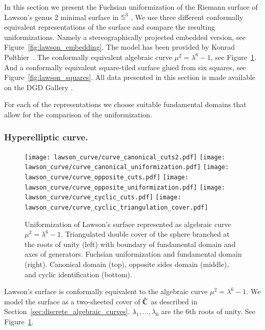 \documentclass[Thesis]{subfiles}
\begin{document}
In this section we present the Fuchsian uniformization of the Riemann surface of Lawson's genus 2 minimal surface in $\mathbb{S}^3$ \cite{Law1970}.
We use three different conformally equivalent representations of the surface and compare the resulting uniformizations.
Namely a stereographically projected embedded version, see Figure~\ref{fig:lawson_embedding}.
The model has been provided by Konrad Polthier~\cite{polthier97}.
The conformally equivalent algebraic curve $\mu^2=\lambda^6-1$, see Figure~\ref{fig:lawson_curve}.
And a conformally equivalent square-tiled surface glued from six squares, see Figure~\ref{fig:lawson_squares}.
All data presented in this section is made available on the {\sc DGD Gallery} \cite{gallery-lawson-webpage}.

For each of the representations we choose suitable fundamental domains that allow for the comparison of the uniformization.

\subsubsection{Hyperelliptic curve.}
\label{sec:lawson_curve}

\begin{figure}
	\centering
	\resizebox{!}{6cm} {
	\texttt{[image: lawson\_curve/curve\_canonical\_cuts2.pdf]}
	\texttt{[image: lawson\_curve/curve\_canonical\_uniformization.pdf]}
	}
	\resizebox{!}{6cm} {
	\texttt{[image: lawson\_curve/curve\_opposite\_cuts.pdf]}
	\texttt{[image: lawson\_curve/curve\_opposite\_uniformization.pdf]}
	}
	\resizebox{!}{6cm} {
	\texttt{[image: lawson\_curve/curve\_cyclic\_cuts.pdf]}
	\texttt{[image: lawson\_curve/curve\_cyclic\_triangulation\_cover.pdf]}
	}
	\caption{Uniformization of Lawson's surface represented as algebraic curve $\mu^2=\lambda^6-1$. Triangulated double cover of the sphere branched at the roots of unity (left) with boundary of fundamental domain and axes of generators. Fuchsian uniformization and fundamental domain (right). Canonical domain (top), opposite sides domain (middle), and cyclic identification (bottom).}
	\label{fig:lawson_curve}
\end{figure}

Lawson's surface is conformally equivalent to the algebraic curve $\mu^2=\lambda^6-1$.
We model the surface as a two-sheeted cover of $\hat {\mathbb C}$ as described in Section~\ref{sec:discrete_algebraic_curves}. $\lambda_1,\ldots,\lambda_6$ are the 6th roots of unity.
See Figure~\ref{fig:lawson_curve}.
\end{document}
